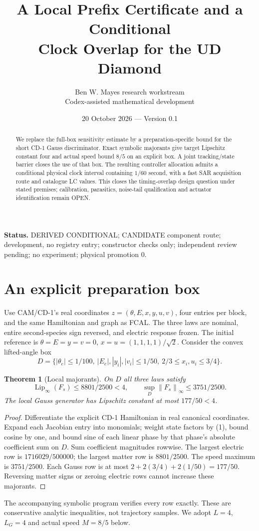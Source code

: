 \documentclass[10pt,a4paper]{article}
\title{A Local Prefix Certificate and a Conditional\\Clock Overlap for the UD Diamond}
\author{Ben W. Mayes research workstream\\Codex-assisted mathematical development}
\date{20 October 2026 --- Version 0.1}
\newcommand{\norm}[1]{\left\|#1\right\|_\infty}
\newtheorem{theorem}{Theorem}
\begin{document}
\maketitle
\begin{abstract}
We replace the full-box sensitivity estimate by a preparation-specific bound for the short CD-1 Gauss discriminator. Exact symbolic majorants give target Lipschitz constant four and actual speed bound $8/5$ on an explicit box. A joint tracking/state barrier closes the use of that box. The resulting controller allocation admits a conditional physical clock interval containing $1/60$ second, with a fast SAR acquisition route and catalogue LC values. This closes the timing-overlap design question under stated premises; calibration, parasitics, noise-tail qualification and actuator identification remain OPEN.
\end{abstract}
\noindent\textbf{Status.} DERIVED CONDITIONAL; CANDIDATE component route; development, no registry entry; constructor checks only; independent review pending; no experiment; physical promotion 0.
\section{An explicit preparation box}
Use CAM/CD-1's real coordinates $z=(\theta,E,x,y,u,v)$, four entries per block, and the same Hamiltonian and graph as FCAL. The three laws are nominal, entire second-species sign reversed, and electric response frozen. The initial reference is
$\theta=E=y=v=0$, $x=u=(1,1,1,1)/\sqrt2$.
Consider the convex lifted-angle box
\begin{equation}
D=\{|\theta_e|\leq1/100,\ |E_e|,|y_i|,|v_i|\leq1/50,\
2/3\leq x_i,u_i\leq3/4\}.
\end{equation}
\begin{theorem}[Local majorants]
On $D$ all three laws satisfy
\begin{equation}
\operatorname{Lip}_\infty(F_s)\leq8801/2500<4,\qquad
\sup_D\norm{F_s}\leq3751/2500 .
\end{equation}
The local Gauss generator has Lipschitz constant at most $177/50<4$.
\end{theorem}
\begin{proof}
Differentiate the explicit CD-1 Hamiltonian in real canonical coordinates. Expand each Jacobian entry into monomials; weight state factors by (1), bound cosine by one, and bound sine of each linear phase by that phase's absolute coefficient sum on $D$. Sum coefficient magnitudes rowwise. The largest electric row is $1716029/500000$; the largest matter row is $8801/2500$. The speed maximum is $3751/2500$. Each Gauss row is at most $2+2(3/4)+2(1/50)=177/50$. Reversing matter signs or zeroing electric rows cannot increase these majorants.
\end{proof}
The accompanying symbolic program verifies every row exactly. These are conservative analytic inequalities, not trajectory samples. We adopt $L=4$, $L_G=4$ and actual speed $M=8/5$ below.
\newpage
\end{document}

